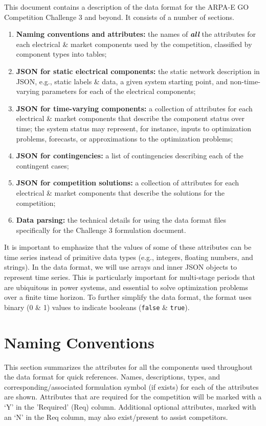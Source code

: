 \documentclass{article}
\begin{document}
This document contains a description of the data format for the ARPA-E GO Competition Challenge 3 and beyond. It consists of a number of sections.
\begin{enumerate}[I]
    \item {\bf Naming conventions and attributes:} the names of \textit{\textbf{all}} the attributes for each electrical \& market components used by the competition, classified by component types into tables;

    \item {\bf JSON for static electrical components:} the static network description in JSON, e.g., static labels \& data, a given system starting point, and non-time-varying parameters for each of the electrical components;

    \item {\bf JSON for time-varying components:} a collection of attributes for each electrical \& market components that describe the component status over time; the system status may represent, for instance, inputs to optimization problems,  forecasts, or approximations to the optimization problems;
    \item {\bf JSON for contingencies:} a list of contingencies describing each of the contingent cases;
    \item {\bf JSON for competition solutions:} a collection of attributes for each electrical \& market components that describe the solutions for the competition;
     \item {\bf Data parsing:}
     the technical details for using the data format files specifically for the Challenge 3 formulation document.
\end{enumerate}
It is important to emphasize that the values of some of these attributes can be time series instead of primitive data types (e.g., integers, floating numbers, and strings).
In the data format, we will use arrays and inner JSON objects to represent time series.
This is particularly important for multi-stage periods that are ubiquitous in power systems, and essential
to solve optimization problems over a finite time horizon.
To further simplify the data format, the format uses binary (0 \& 1) values to indicate booleans (\texttt{false} \& \texttt{true}).  

\section{Naming Conventions}
\label{sec:naming}
This section summarizes the attributes for all the components used throughout the data format for quick references.
Names, descriptions, types, and corresponding/associated formulation symbol (if exists) for each of the attributes are shown.
Attributes that are required for the competition
will be marked with a `Y' in the 'Required' (Req) column.
Additional optional attributes, marked with an `N' in the Req column, may also exist/present to assist competitors.
\end{document}
